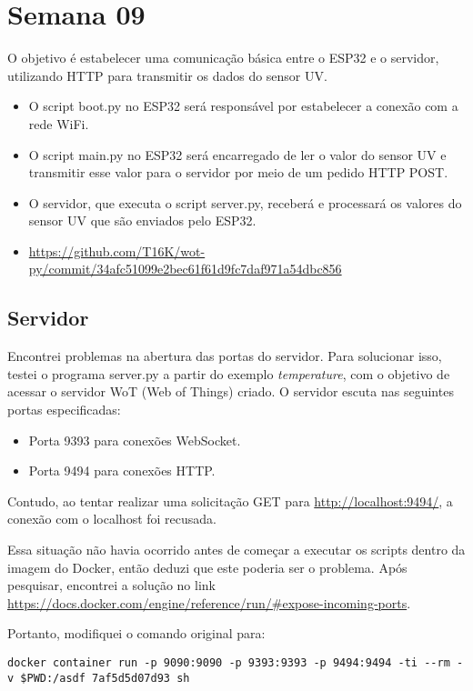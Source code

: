 
\section{Semana 09}

O objetivo é estabelecer uma comunicação básica entre o ESP32 e o servidor, utilizando HTTP para transmitir os dados do sensor UV.

\begin{itemize}
    \item O script boot.py no ESP32 será responsável por estabelecer a conexão com a rede WiFi.
    \item O script main.py no ESP32 será encarregado de ler o valor do sensor UV e transmitir esse valor para o servidor por meio de um pedido HTTP POST.
    \item O servidor, que executa o script server.py, receberá e processará os valores do sensor UV que são enviados pelo ESP32.
    \item \url{https://github.com/T16K/wot-py/commit/34afc51099e2bec61f61d9fc7daf971a54dbc856}
\end{itemize}

\subsection{Servidor}

Encontrei problemas na abertura das portas do servidor. Para solucionar isso, testei o programa server.py a partir do exemplo \textit{temperature}, com o objetivo de acessar o servidor WoT (Web of Things) criado. O servidor escuta nas seguintes portas especificadas:

\begin{itemize}
\item Porta 9393 para conexões WebSocket.
\item Porta 9494 para conexões HTTP.
\end{itemize}

Contudo, ao tentar realizar uma solicitação GET para \url{http://localhost:9494/}, a conexão com o localhost foi recusada.

Essa situação não havia ocorrido antes de começar a executar os scripts dentro da imagem do Docker, então deduzi que este poderia ser o problema. Após pesquisar, encontrei a solução no link \url{https://docs.docker.com/engine/reference/run/#expose-incoming-ports}.

Portanto, modifiquei o comando original para: 
\begin{lstlisting}[breaklines]
docker container run -p 9090:9090 -p 9393:9393 -p 9494:9494 -ti --rm -v $PWD:/asdf 7af5d5d07d93 sh
\end{lstlisting}


